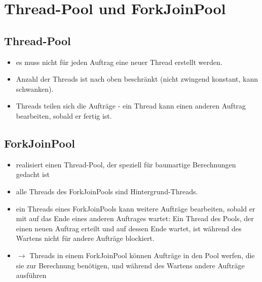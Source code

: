 \section{Thread-Pool und ForkJoinPool}

\subsection{Thread-Pool}

\begin{itemize}
    \item es muss nicht für jeden Auftrag eine neuer Thread erstellt werden.
    \item Anzahl der Threads ist nach oben beschränkt (nicht zwingend konstant, kann schwanken).
    \item Threads teilen sich die Aufträge - ein Thread kann einen anderen Auftrag bearbeiten, sobald er fertig ist.
\end{itemize}

\subsection{ForkJoinPool}

\begin{itemize}
    \item realisiert einen Thread-Pool, der speziell für baumartige Berechnungen gedacht ist
    \item alle Threads des ForkJoinPools sind Hintergrund-Threads.
    \item ein Threads eines ForkJoinPools kann weitere Aufträge bearbeiten, sobald er mit  auf das Ende eines anderen Auftrages wartet: Ein Thread des Pools, der einen neuen Auftrag erteilt und auf dessen Ende wartet, ist während des Wartens nicht für andere Aufträge blockiert.
    \item[] $\rightarrow$ Threads in einem ForkJoinPool können Aufträge in den Pool werfen, die sie zur Berechnung benötigen, und während des Wartens andere Aufträge ausführen
\end{itemize}
